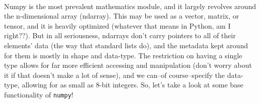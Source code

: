 \documentclass[12pt]{article}
\begin{document}
\\

Numpy is the most prevalent mathematics module, and it largely revolves around the n-dimensional array (ndarray). This may be used as a vector, matrix, or tensor, and it is heavily optimized (whatever that means in Python, am I right??). But in all seriousness, ndarrays don't carry pointers to all of their elements' data (the way that standard lists do), and the metadata kept around for them is mostly in shape and data-type. The restriction on having a single type allows for far more efficient accessing and manipulation (don't worry about it if that doesn't make a lot of sense), and we can--of course--specify the data-type, allowing for as small as 8-bit integers. So, let's take a look at some base functionality of \texttt{numpy}!\\
\end{document}
